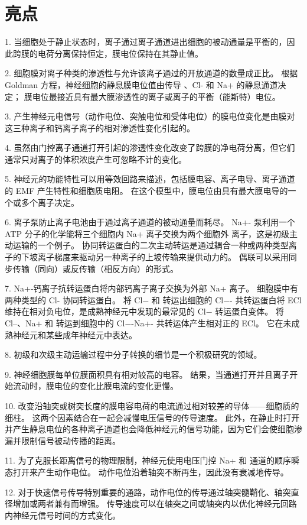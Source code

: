 \section{亮点}

1. 当细胞处于静止状态时，离子通过离子通道进出细胞的被动通量是平衡的，因此跨膜的电荷分离保持恒定，膜电位保持在其静止值。 


2. 细胞膜对离子种类的渗透性与允许该离子通过的开放通道的数量成正比。
根据 Goldman 方程，神经细胞的静息膜电位值由传导 、Cl- 和 Na+ 的静息通道决定；
膜电位最接近具有最大膜渗透性的离子或离子的平衡（能斯特）电位。 


3. 产生神经元电信号（动作电位、突触电位和受体电位）的膜电位变化是由膜对这三种离子和钙离子离子的相对渗透性变化引起的。 


4. 虽然由门控离子通道打开引起的渗透性变化改变了跨膜的净电荷分离，但它们通常只对离子的体积浓度产生可忽略不计的变化。


5. 神经元的功能特性可以用等效回路来描述，包括膜电容、离子电导、离子通道的 EMF 产生特性和细胞质电阻。
在这个模型中，膜电位由具有最大膜电导的一个或多个离子决定。 


6. 离子泵防止离子电池由于通过离子通道的被动通量而耗尽。
Na+- 泵利用一个 ATP 分子的化学能将三个细胞内 Na+ 离子交换为两个细胞外  离子，这是初级主动运输的一个例子。
协同转运蛋白的二次主动转运是通过耦合一种或两种类型离子的下坡离子梯度来驱动另一种离子的上坡传输来提供动力的。
偶联可以采用同步传输（同向）或反传输（相反方向）的形式。 


7. Na+-钙离子抗转运蛋白将内部钙离子离子交换为外部 Na+ 离子。
细胞膜中有两种类型的 Cl- 协同转运蛋白。
将 Cl− 和  转运出细胞的 Cl−- 共转运蛋白将 ECl 维持在相对负电位，是成熟神经元中发现的最常见的 Cl− 转运蛋白变体。
将 Cl–、Na+ 和  转运到细胞中的 Cl−-Na+- 共转运体产生相对正的 ECl。
它在未成熟神经元和某些成年神经元中表达。 


8. 初级和次级主动运输过程中分子转换的细节是一个积极研究的领域。


9. 神经细胞膜每单位膜面积具有相对较高的电容。
结果，当通道打开并且离子开始流动时，膜电位的变化比膜电流的变化更慢。


10. 改变沿轴突或树突长度的膜电容电荷的电流通过相对较差的导体——细胞质的细柱。
这两个因素结合在一起会减慢电压信号的传导速度。
此外，在静止时打开并产生静息电位的各种离子通道也会降低神经元的信号功能，因为它们会使细胞渗漏并限制信号被动传播的距离。 


11. 为了克服长距离信号的物理限制，神经元使用电压门控 Na+ 和  通道的顺序瞬态打开来产生动作电位。
动作电位沿着轴突不断再生，因此没有衰减地传导。 


12. 对于快速信号传导特别重要的通路，动作电位的传导通过轴突髓鞘化、轴突直径增加或两者兼有而增强。
传导速度可以在轴突之间或轴突内以优化神经元回路内神经元信号时间的方式变化。









